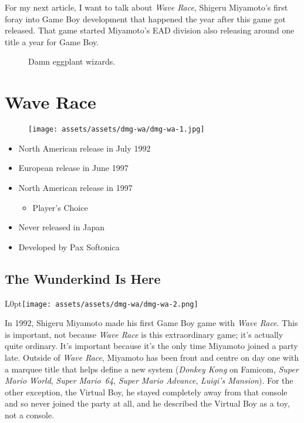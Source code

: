 \documentclass{book}
\begin{document}
For my next article, I want to talk about \emph{Wave Race}, Shigeru Miyamoto’s first foray into Game Boy development that happened the year after this game got released. That game started Miyamoto’s EAD division also releasing around one title a year for Game Boy.\par
\FloatBarrier\vspace{\baselineskip}\begin{figure}[H]\caption*{Damn eggplant wizards.}\end{figure}
\chapter*{Wave Race}
\vspace{\baselineskip}\begin{figure}[H]{\texttt{[image: assets/assets/dmg-wa/dmg-wa-1.jpg]}}\end{figure}\vspace{\baselineskip}
\begin{itemize}[left=0pt, nosep]
\item North American release in July 1992
\item European release in June 1997
\item North American release in 1997
\begin{itemize}
\item Player’s Choice
\end{itemize}
\item Never released in Japan
\item Developed by Pax Softonica

\end{itemize}
\newpage\FloatBarrier\section*{The Wunderkind Is Here}
\begin{wrapfigure}{L}{0pt}{\texttt{[image: assets/assets/dmg-wa/dmg-wa-2.png]}}\end{wrapfigure}\noindent
In 1992, Shigeru Miyamoto made his first Game Boy game with \emph{Wave Race}. This is important, not because \emph{Wave Race} is this extraordinary game; it’s actually quite ordinary. It’s important because it’s the only time Miyamoto joined a party late. Outside of \emph{Wave Race}, Miyamoto has been front and centre on day one with a marquee title that helps define a new system (\emph{Donkey Kong} on Famicom, \emph{Super Mario World}, \emph{Super Mario~64}, \emph{Super Mario Advance}, \emph{Luigi’s Mansion}). For the other exception, the Virtual Boy, he stayed completely away from that console and so never joined the party at all, and he described the Virtual Boy as a toy, not a console.\par
\end{document}
